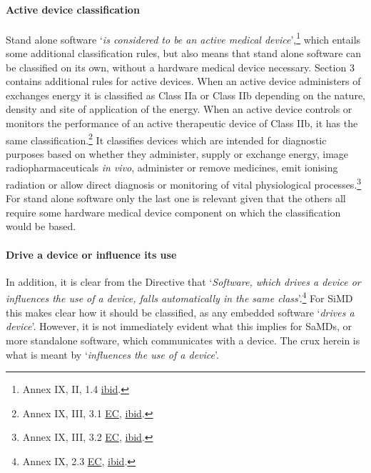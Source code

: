 \documentclass[
]{scrartcl}
\begin{document}
\hypertarget{active-device-classification}{%
\paragraph{Active device classification}\label{active-device-classification}}

Stand alone software `\emph{is considered to be an active medical device}',\footnote{Annex IX, II, 1.4 \protect\hyperlink{ref-ecCOUNCILDIRECTIVE931993}{ibid}.} which entails some additional classification rules, but also means that stand alone software can be classified on its own, without a hardware medical device necessary. Section 3 contains additional rules for active devices. When an active device administers of exchanges energy it is classified as Class IIa or Class IIb depending on the nature, density and site of application of the energy. When an active device controls or monitors the performance of an active therapeutic device of Class IIb, it has the same classification.\footnote{Annex IX, III, 3.1 \protect\hyperlink{ref-ecCOUNCILDIRECTIVE931993}{EC}, \protect\hyperlink{ref-ecCOUNCILDIRECTIVE931993}{ibid}.} It classifies devices which are intended for diagnostic purposes based on whether they administer, supply or exchange energy, image radiopharmaceuticals \emph{in vivo}, administer or remove medicines, emit ionising radiation or allow direct diagnosis or monitoring of vital physiological processes.\footnote{Annex IX, III, 3.2 \protect\hyperlink{ref-ecCOUNCILDIRECTIVE931993}{EC}, \protect\hyperlink{ref-ecCOUNCILDIRECTIVE931993}{ibid}.} For stand alone software only the last one is relevant given that the others all require some hardware medical device component on which the classification would be based.

\hypertarget{drive-a-device-or-influence-its-use}{%
\paragraph{Drive a device or influence its use}\label{drive-a-device-or-influence-its-use}}

In addition, it is clear from the Directive that `\emph{Software, which drives a device or influences the use of a device, falls automatically in the same class}'.\footnote{Annex IX, 2.3 \protect\hyperlink{ref-ecCOUNCILDIRECTIVE931993}{EC}, \protect\hyperlink{ref-ecCOUNCILDIRECTIVE931993}{ibid}.} For SiMD this makes clear how it should be classified, as any embedded software `\emph{drives a device}'. However, it is not immediately evident what this implies for SaMDs, or more standalone software, which communicates with a device. The crux herein is what is meant by `\emph{influences the use of a device}'.
\end{document}
